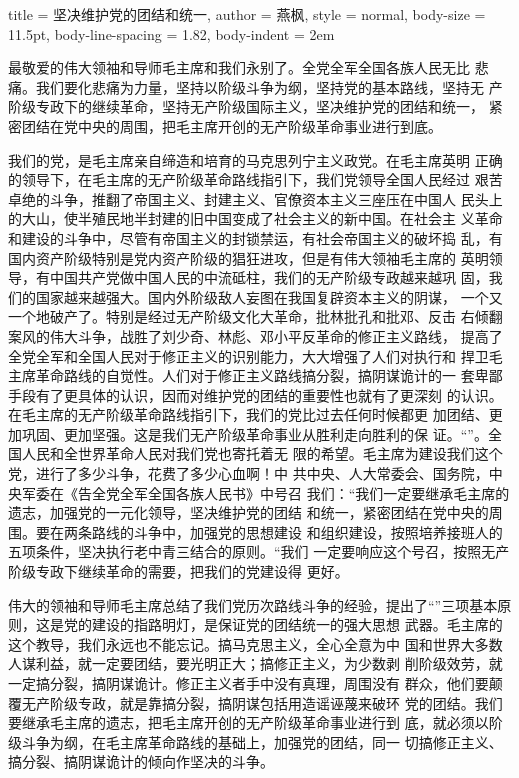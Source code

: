 \begin{hongqiarticle}{
        title  = {坚决维护党的团结和统一},
        author = {燕枫},
        style  = normal,
        body-size = 11.5pt,
        body-line-spacing = 1.82,
        body-indent = 2em
    }
    
    最敬爱的伟大领袖和导师毛主席和我们永别了。全党全军全国各族人民无比
    悲痛。我们要化悲痛为力量，坚持以阶级斗争为纲，坚持党的基本路线，坚持无
    产阶级专政下的继续革命，坚持无产阶级国际主义，坚决维护党的团结和统一，
    紧密团结在党中央的周围，把毛主席开创的无产阶级革命事业进行到底。
    
    我们的党，是毛主席亲自缔造和培育的马克思列宁主义政党。在毛主席英明
    正确的领导下，在毛主席的无产阶级革命路线指引下，我们党领导全国人民经过
    艰苦卓绝的斗争，推翻了帝国主义、封建主义、官僚资本主义三座压在中国人
    民头上的大山，使半殖民地半封建的旧中国变成了社会主义的新中国。在社会主
    义革命和建设的斗争中，尽管有帝国主义的封锁禁运，有社会帝国主义的破坏捣
    乱，有国内资产阶级特别是党内资产阶级的猖狂进攻，但是有伟大领袖毛主席的
    英明领导，有中国共产党做中国人民的中流砥柱，我们的无产阶级专政越来越巩
    固，我们的国家越来越强大。国内外阶级敌人妄图在我国复辟资本主义的阴谋，
    一个又一个地破产了。特别是经过无产阶级文化大革命，批林批孔和批邓、反击
    右倾翻案风的伟大斗争，战胜了刘少奇、林彪、邓小平反革命的修正主义路线，
    提高了全党全军和全国人民对于修正主义的识别能力，大大增强了人们对执行和
    捍卫毛主席革命路线的自觉性。人们对于修正主义路线搞分裂，搞阴谋诡计的一
    套卑鄙手段有了更具体的认识，因而对维护党的团结的重要性也就有了更深刻
    的认识。在毛主席的无产阶级革命路线指引下，我们的党比过去任何时候都更
    加团结、更加巩固、更加坚强。这是我们无产阶级革命事业从胜利走向胜利的保
    证。“”。全国人民和全世界革命人民对我们党也寄托着无
    限的希望。毛主席为建设我们这个党，进行了多少斗争，花费了多少心血啊！中
    共中央、人大常委会、国务院，中央军委在《告全党全军全国各族人民书》中号召
    我们：“我们一定要继承毛主席的遗志，加强党的一元化领导，坚决维护党的团结
    和统一，紧密团结在党中央的周围。要在两条路线的斗争中，加强党的思想建设
    和组织建设，按照培养接班人的五项条件，坚决执行老中青三结合的原则。“我们
    一定要响应这个号召，按照无产阶级专政下继续革命的需要，把我们的党建设得
    更好。
    
    伟大的领袖和导师毛主席总结了我们党历次路线斗争的经验，提出了“”三项基本原则，这是党的建设的指路明灯，是保证党的团结统一的强大思想
    武器。毛主席的这个教导，我们永远也不能忘记。搞马克思主义，全心全意为中
    国和世界大多数人谋利益，就一定要团结，要光明正大；搞修正主义，为少数剥
    削阶级效劳，就一定搞分裂，搞阴谋诡计。修正主义者手中没有真理，周围没有
    群众，他们要颠覆无产阶级专政，就是靠搞分裂，搞阴谋包括用造谣诬蔑来破环
    党的团结。我们要继承毛主席的遗志，把毛主席开创的无产阶级革命事业进行到
    底，就必须以阶级斗争为纲，在毛主席革命路线的基础上，加强党的团结，同一
    切搞修正主义、搞分裂、搞阴谋诡计的倾向作坚决的斗争。
    

\end{hongqiarticle}
